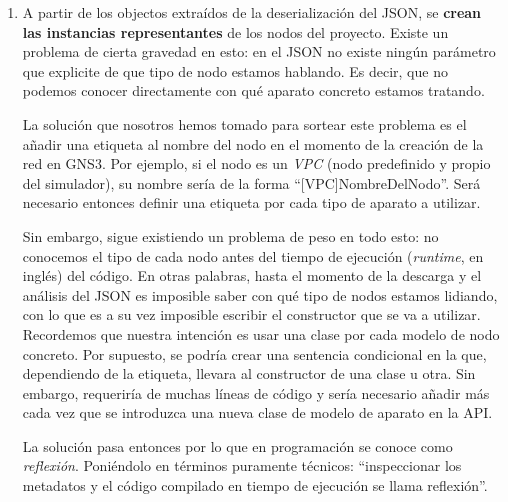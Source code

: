 \begin{enumerate}
\item A partir de los objectos extraídos de la deserialización del JSON, se \textbf{crean las instancias representantes} de los nodos del proyecto. Existe un problema de cierta gravedad en esto: en el JSON no existe ningún parámetro que explicite de que tipo de nodo estamos hablando. Es decir, que no podemos conocer directamente con qué aparato concreto estamos tratando.

La solución que nosotros hemos tomado para sortear este problema es el añadir una etiqueta al nombre del nodo en el momento de la creación de la red en GNS3. Por ejemplo, si el nodo es un \textit{VPC} (nodo predefinido y propio del simulador), su nombre sería de la forma ``[VPC]NombreDelNodo''. Será necesario entonces definir una etiqueta por cada tipo de aparato a utilizar.

Sin embargo, sigue existiendo un problema de peso en todo esto: no conocemos el tipo de cada nodo antes del tiempo de ejecución (\textit{runtime}, en inglés) del código. En otras palabras, hasta el momento de la descarga y el análisis del JSON es imposible saber con qué tipo de nodos estamos lidiando, con lo que es a su vez imposible escribir el constructor que se va a utilizar. Recordemos que nuestra intención es usar una clase por cada modelo de nodo concreto. Por supuesto, se podría crear una sentencia condicional en la que, dependiendo de la etiqueta, llevara al constructor de una clase u otra. Sin embargo, requeriría de muchas líneas de código y sería necesario añadir más cada vez que se introduzca una nueva clase de modelo de aparato en la API.

La solución pasa entonces por lo que en programación se conoce como \textit{reflexión}. Poniéndolo en términos puramente técnicos: ``inspeccionar los metadatos y el código compilado en tiempo de ejecución se llama reflexión''\cite{csnutshell}.


\end{enumerate}
